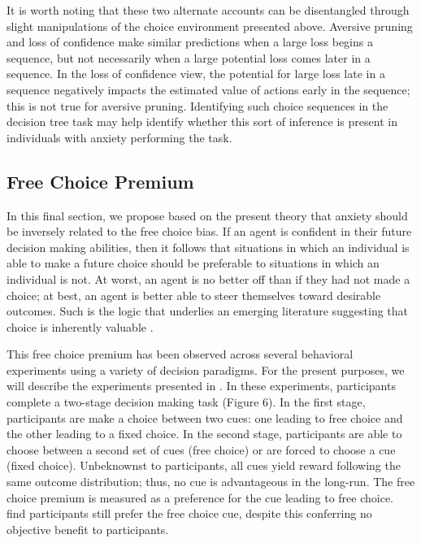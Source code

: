 \documentclass[11pt]{article} %
\begin{document}

It is worth noting that these two alternate accounts can be disentangled through slight manipulations of the choice environment presented above. Aversive pruning and loss of confidence make similar predictions when a large loss begins a sequence, but not necessarily when a large potential loss comes later in a sequence. In the loss of confidence view, the potential for large loss late in a sequence negatively impacts the estimated value of actions early in the sequence; this is not true for aversive pruning. Identifying such choice sequences in the decision tree task may help identify whether this sort of inference is present in individuals with anxiety performing the task.

\subsection{Free Choice Premium}

In this final section, we propose based on the present theory that anxiety should be inversely related to the free choice bias. If an agent is confident in their future decision making abilities, then it follows that situations in which an individual is able to make a future choice should be preferable to situations in which an individual is not. At worst, an agent is no better off than if they had not made a choice; at best, an agent is better able to steer themselves toward desirable outcomes. Such is the logic that underlies an emerging literature suggesting that choice is inherently valuable \citep{Leotti2010}.

This free choice premium has been observed across several behavioral experiments \citep{Suzuki1997, Leotti2011, Leotti2014, Cockburn2014} using a variety of decision paradigms. For the present purposes, we will describe the experiments presented in \citep{Leotti2011, Leotti2014}. In these experiments, participants complete a two-stage decision making task (Figure 6). In the first stage, participants are make a choice between two cues: one leading to free choice and the other leading to a fixed choice. In the second stage, participants are able to choose between a second set of cues (free choice) or are forced to choose a cue (fixed choice). Unbeknownst to participants, all cues yield reward following the same outcome distribution; thus, no cue is advantageous in the long-run. The free choice premium is measured as a preference for the cue leading to free choice. \cite{Leotti2011, Leotti2014} find participants still prefer the free choice cue, despite this conferring no objective benefit to participants.
\end{document}
